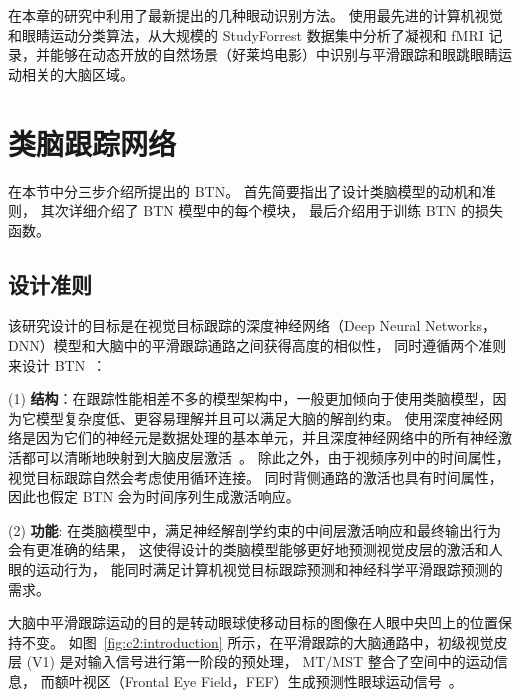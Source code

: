 在本章的研究中利用了最新提出的几种眼动识别方法。
使用最先进的计算机视觉和眼睛运动分类算法，从大规模的 StudyForrest 数据集中分析了凝视和 fMRI 记录，并能够在动态开放的自然场景（好莱坞电影）中识别与平滑跟踪和眼跳眼睛运动相关的大脑区域。



\section{类脑跟踪网络}

在本节中分三步介绍所提出的 BTN。
首先简要指出了设计类脑模型的动机和准则，
其次详细介绍了 BTN 模型中的每个模块，
最后介绍用于训练 BTN 的损失函数。


\subsection{设计准则}
该研究设计的目标是在视觉目标跟踪的深度神经网络（Deep Neural Networks，DNN）模型和大脑中的平滑跟踪通路之间获得高度的相似性，
同时遵循两个准则来设计 BTN~\cite{kubilius2018predict}：

(1) \textbf{结构}：在跟踪性能相差不多的模型架构中，一般更加倾向于使用类脑模型，因为它模型复杂度低、更容易理解并且可以满足大脑的解剖约束。
使用深度神经网络是因为它们的神经元是数据处理的基本单元，并且深度神经网络中的所有神经激活都可以清晰地映射到大脑皮层激活~\cite{yamins2016using}。
除此之外，由于视频序列中的时间属性，视觉目标跟踪自然会考虑使用循环连接。
同时背侧通路的激活也具有时间属性，因此也假定 BTN 会为时间序列生成激活响应。

(2) \textbf{功能}: 
在类脑模型中，满足神经解剖学约束的中间层激活响应和最终输出行为会有更准确的结果，
这使得设计的类脑模型能够更好地预测视觉皮层的激活和人眼的运动行为，
能同时满足计算机视觉目标跟踪预测和神经科学平滑跟踪预测的需求。

大脑中平滑跟踪运动的目的是转动眼球使移动目标的图像在人眼中央凹上的位置保持不变。
如图~\ref{fig:c2:introduction} 所示，在平滑跟踪的大脑通路中，初级视觉皮层 (V1) 是对输入信号进行第一阶段的预处理，
MT/MST 整合了空间中的运动信息，
而额叶视区（Frontal Eye Field，FEF）生成预测性眼球运动信号~\cite{b11,b13,b14}。

